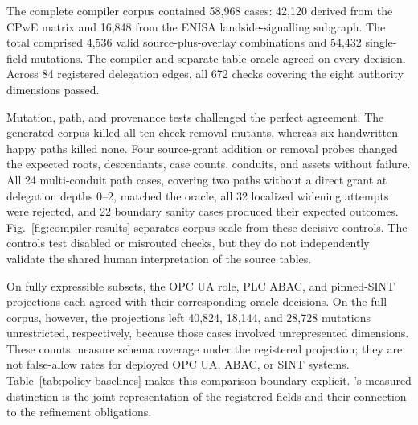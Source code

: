 The complete compiler corpus contained 58,968 cases: 42,120 derived from the CPwE matrix and 16,848 from the ENISA landside-signalling subgraph. The total comprised 4,536 valid source-plus-overlay combinations and 54,432 single-field mutations. The \zonecap{} compiler and separate table oracle agreed on every decision. Across 84 registered delegation edges, all 672 checks covering the eight authority dimensions passed.

Mutation, path, and provenance tests challenged the perfect agreement. The generated corpus killed all ten check-removal mutants, whereas six handwritten happy paths killed none. Four source-grant addition or removal probes changed the expected roots, descendants, case counts, conduits, and assets without failure. All 24 multi-conduit path cases, covering two paths without a direct grant at delegation depths 0--2, matched the oracle, all 32 localized widening attempts were rejected, and 22 boundary sanity cases produced their expected outcomes. Fig.~\ref{fig:compiler-results} separates corpus scale from these decisive controls. The controls test disabled or misrouted checks, but they do not independently validate the shared human interpretation of the source tables.

On fully expressible subsets, the OPC UA role, PLC ABAC, and pinned-SINT projections each agreed with their corresponding oracle decisions. On the full corpus, however, the projections left 40,824, 18,144, and 28,728 mutations unrestricted, respectively, because those cases involved unrepresented dimensions. These counts measure schema coverage under the registered projection; they are not false-allow rates for deployed OPC UA, ABAC, or SINT systems. Table~\ref{tab:policy-baselines} makes this comparison boundary explicit. \zonecap{}'s measured distinction is the joint representation of the registered fields and their connection to the refinement obligations.

